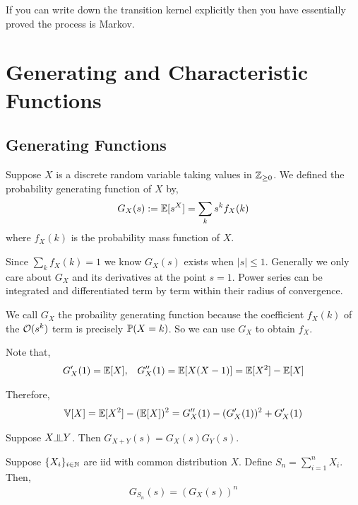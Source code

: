 \documentclass[12pt]{article}
\begin{document}
If you can write down the transition kernel explicitly then you have essentially proved the process is Markov.


\section{Generating and Characteristic Functions}

\subsection{Generating Functions}

\begin{definition}
Suppose \( X \) is a discrete random variable taking values in \( \mathbb{Z}_{\geq 0} \). We defined the probability generating function of \( X \) by,
\begin{align*}
    G_X(s) := \mathbb{E}[s^X] = \sum_k s^k f_X(k)
\end{align*}
where \( f_X(k) \) is the probability mass function of \( X \).
\end{definition}

Since \( \sum_k f_X(k) = 1 \) we know \( G_X(s) \) exists when \( |s| \leq 1 \). Generally we only care about \( G_X \) and its derivatives at the point \( s=1 \). Power series can be integrated and differentiated term by term within their radius of convergence.

We call \( G_X \) the probaility generating function because the coefficient \( f_X(k) \) of the \( \mathcal{O}(s^k) \) term is precisely \( \mathbb{P}(X = k) \). So we can use \( G_X \) to obtain \( f_X \).

Note that,
\begin{align*}
    G'_X(1) = \mathbb{E}[X], && G''_X(1) = \mathbb{E}[X(X-1)] = \mathbb{E}[X^2]-\mathbb{E}[X]
\end{align*}

Therefore,
\begin{align*}
    \mathbb{V}[X] = \mathbb{E}[X^2] - (\mathbb{E}[X])^2 = G''_X(1) - (G'_X(1))^2 + G'_X(1)
\end{align*}

\begin{theorem}
Suppose \( X\indep Y \). Then \( G_{X+Y}(s) = G_X(s)G_Y(s) \).
\end{theorem}


\begin{theorem}
Suppose \( \{X_i\}_{i\in\mathbb{N}} \) are iid with common distribution \( X \). Define \( S_n = \sum_{i=1}^{n} X_i \). Then,
\begin{align*}
    G_{S_n}(s) = (G_X(s))^n
\end{align*}
\end{theorem}
\end{document}
